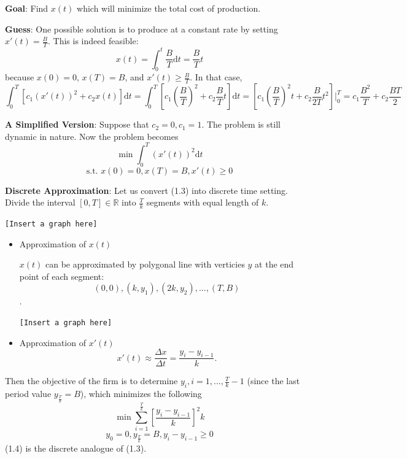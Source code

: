 \documentclass[twoside]{article}
\begin{document}
{\bf Goal}: Find $x(t)$ which will minimize the total cost of production.

{\bf Guess}: One possible solution is to produce at a constant rate by setting $x'(t) = \frac{B}{T}$. This is indeed feasible:
\begin{equation}
  x(t) = \int_0^t \frac{B}{T} \mathrm{d}t = \frac{B}{T} t
\end{equation}
because $x(0) = 0$, $x(T) = B$, and $x'(t) \geq \frac{B}{T}$. In that case, 
\begin{equation}
  \int_0^T [c_1 (x'(t))^2 + c_2 x(t)] \mathrm{d}t = \int_0^T \left [c_1 (\frac{B}{T})^2 + c_2 \frac{B}{T}t \right ] \mathrm{d}t = \left [c_1 (\frac{B}{T})^2 t + c_2 \frac{B}{2T}t^2 \right ]{\Bigg |}_0^T = c_1\frac{ B^2}{T} + c_2 \frac{BT}{2}
\end{equation}

{\bf A Simplified Version}: Suppose that $c_2=0, c_1= 1$. The problem is still dynamic in nature. Now the problem becomes
$$\min \int_0^T (x'(t))^2 \mathrm{d}t$$
\begin{equation}
  \text{s.t.  } x(0) = 0, x(T) = B, x'(t) \geq 0
\end{equation}

\textbf{Discrete Approximation}: Let us convert (1.3) into discrete time setting. Divide the interval $[0, T] \in \mathbb{R}$ into $\frac{T}{k}$ segments with equal length of $k$.

\begin{center}
  \texttt{[Insert a graph here]}
\end{center}

\begin{itemize}
  \item Approximation of $x(t)$

  $x(t)$ can be approximated by polygonal line with verticies $y$ at the end point of each segment: 
  $$(0, 0), (k, y_1), (2k, y_2), ..., (T, B) $$.
  \begin{center}
  \texttt{[Insert a graph here]}
  \end{center}
  
  \item Approximation of $x'(t)$
  $$x'(t) \approx \dfrac{\Delta x}{\Delta t} = \dfrac{y_i - y_{i-1}}{k}.$$
\end{itemize}

Then the objective of the firm is to determine $y_i, i=1, ..., \frac{T}{k}-1$ (since the last period value $y_{\frac{T}{k}} = B$), which minimizes the following
$$\min \sum_{i=1}^{\frac{T}{k}} \left [ \frac{y_i - y_{i-1}}{k} \right ]^2 k$$
\begin{equation}
  y_0 = 0, y_{\frac{T}{k}} = B, y_i - y_{i-1} \geq 0
\end{equation}
(1.4) is the discrete analogue of (1.3).
\end{document}
